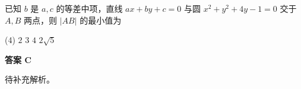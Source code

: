 \begin{choice}[source={2024年高考全国甲卷理科选择题\#12}, topic={等差中项与圆的弦长}]
已知 $b$ 是 $a,c$ 的等差中项，直线 $ax+by+c=0$ 与圆 $x^{2}+y^{2}+4y-1=0$ 交于 $A,B$ 两点，则 $\lvert AB\rvert$ 的最小值为
\begin{tasks}(4)
	\task $2$
	\task $3$
	\task $4$
	\task $2\sqrt{5}$
\end{tasks}
\end{choice}
\begin{choice-sol}
\textbf{答案 C}

待补充解析。
\end{choice-sol}
